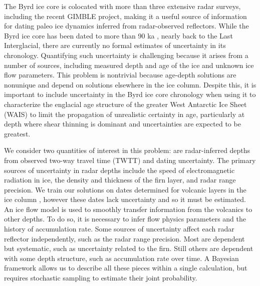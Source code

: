 
The Byrd ice core is colocated with more than three extensive radar surveys, including the recent GIMBLE project, making it a useful source of information for dating paleo ice dynamics inferred from radar-observed reflectors. While the Byrd ice core has been dated to more than 90 ka \citep{blunier2001}, nearly back to the Last Interglacial, there are currently no formal estimates of uncertainty in its chronology. Quantifying such uncertainty is challenging because it arises from a number of sources, including measured depth and age of the ice and unknown ice flow parameters. This problem is nontrivial because age-depth solutions are nonunique and depend on solutions elsewhere in the ice column. Despite this, it is important to include uncertainty in the Byrd ice core chronology when using it to characterize the englacial age structure of the greater West Antarctic Ice Sheet (WAIS) to limit the propagation of unrealistic certainty in age, particularly at depth where shear thinning is dominant and uncertainties are expected to be greatest. 

We consider two quantities of interest in this problem: are radar-inferred depths from observed two-way travel time (TWTT) and dating uncertainty. The primary sources of uncertainty in radar depths include the speed of electromagnetic radiation in ice, the density and thickness of the firn layer, and radar range precision. We train our solutions on dates determined for volcanic layers in the ice column \citep{hammer1997}, however these dates lack uncertainty and so it must be estimated. An ice flow model is used to smoothly transfer information from the volcanics to other depths. To do so, it is necessary to infer flow physics parameters and the history of accumulation rate. Some sources of uncertainty affect each radar reflector independently, such as the radar range precision. Most are dependent but systematic, such as uncertainty related to the firn. Still others are dependent with some depth structure, such as accumulation rate over time. A Bayesian framework allows us to describe all these pieces within a single calculation, but requires stochastic sampling to estimate their joint probability.

